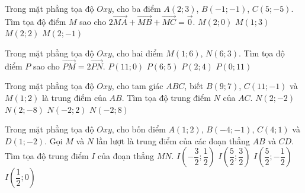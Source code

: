 \begin{ex}%
	Trong mặt phẳng tọa độ $Oxy$, cho ba điểm $A(2;3)$, $B(-1;-1)$, $C(5;-5)$. Tìm tọa độ điểm $M$ sao cho $2\vec{MA}+\vec{MB}+\vec{MC}=\vec{0}$.
	\choice
	{\True $M(2;0)$}
	{$M(1;3)$}
	{$M(2;2)$}
	{$M(2;-1)$}
\end{ex}

\begin{ex}%
	Trong mặt phẳng tọa độ $Oxy$, cho hai điểm $M(1;6)$, $N(6;3)$. Tìm tọa độ điểm $P$ sao cho $\vec{PM}=2\vec{PN}$.
	\choice
	{\True $P(11;0)$}
	{$P(6;5)$}
	{$P(2;4)$}
	{$P(0;11)$}
\end{ex}

\begin{ex}%
	Trong mặt phẳng tọa độ $Oxy$, cho tam giác $ABC$, biết $B(9;7)$, $C(11;-1)$ và $M(1;2)$ là trung điểm của $AB$. Tìm tọa độ trung điểm $N$ của $AC$.
	\choice
	{\True $N(2;-2)$}
	{$N(2;-8)$}
	{$N(-2;2)$}
	{$N(-2;8)$}
\end{ex}

\begin{ex}%
	Trong mặt phẳng tọa độ $Oxy$, cho bốn điểm $A(1;2)$, $B(-4;-1)$, $C(4;1)$ và $D(1;-2)$. Gọi $M$ và $N$ lần lượt là trung điểm của các đoạn thẳng $AB$ và $CD$. Tìm tọa độ trung điểm $I$ của đoạn thẳng $MN$.
	\choice
	{$I\left(-\dfrac{3}{2};\dfrac{1}{2}\right)$}
	{$I\left(\dfrac{5}{2};\dfrac{3}{2}\right)$}
	{$I\left(\dfrac{5}{2};-\dfrac{1}{2}\right)$}
	{\True $I\left(\dfrac{1}{2};0\right)$}
\end{ex}

